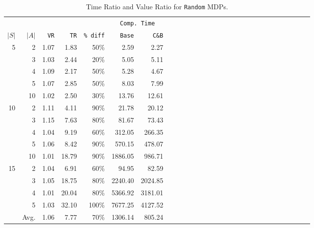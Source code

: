\begin{table}[h] %
 \setlength{\tabcolsep}{2.5pt}
 \renewcommand \arraystretch{1.1}
\begin{center}
\begin{tabular}{rrrrrrrrrrrrrrrrrrrrrrrrrrrr}
	&		&				&				&				&	\multicolumn{2}{c}{	\texttt{Comp. Time}}	\\
$|S|$	&	$|A|$	&		\texttt{VR}		&		\texttt{TR}		&		\texttt{\% diff}		&	\texttt{Base}	&	\texttt{C\&B}	\\
\cmidrule(lr){1-2} \cmidrule(lr){3-3} \cmidrule(lr){4-4}  \cmidrule(lr){5-5}  \cmidrule(lr){6-7}
5	&	2	&			1.07	&			1.83	&			50\%	&	2.59	&	2.27	\\
	&	3	&			1.03	&			2.44	&			20\%	&	5.05	&	5.11	\\
	&	4	&			1.09	&			2.17	&			50\%	&	5.28	&	4.67	\\
	&	5	&			1.07	&			2.85	&			50\%	&	8.03	&	7.99	\\
	&	10	&			1.02	&			2.50	&			30\%	&	13.76	&	12.61	\\
\cmidrule(lr){1-2} \cmidrule(lr){3-3} \cmidrule(lr){4-4}  \cmidrule(lr){5-5}  \cmidrule(lr){6-7}
10	&	2	&			1.11	&			4.11	&			90\%	&	21.78	&	20.12	\\
	&	3	&			1.15	&			7.63	&			80\%	&	81.67	&	73.43	\\
	&	4	&			1.04	&			9.19	&			60\%	&	312.05	&	266.35	\\
	&	5	&			1.06	&			8.42	&			90\%	&	570.15	&	478.07	\\
	&	10	&			1.01	&			18.79	&			90\%	&	1886.05	&	986.71	\\
\cmidrule(lr){1-2} \cmidrule(lr){3-3} \cmidrule(lr){4-4}  \cmidrule(lr){5-5}  \cmidrule(lr){6-7}
15	&	2	&			1.04	&			6.91	&			60\%	&	94.95	&	82.59	\\
	&	3	&			1.05	&			18.75	&			80\%	&	2240.40	&	2024.85	\\
	&	4	&			1.01	&			20.04	&			80\%	&	5366.92	&	3181.01	\\
	&	5	&			1.03	&			32.10	&			100\%	&	7677.25	&	4127.52	\\
\cmidrule(lr){1-2} \cmidrule(lr){3-3} \cmidrule(lr){4-4}  \cmidrule(lr){5-5}  \cmidrule(lr){6-7}
	&	Avg.	&			1.06	&			7.77	&			70\%	&	1306.14	&	805.24	
\end{tabular}						
\end{center}
\caption{Time Ratio and Value Ratio for \texttt{Random} MDPs.}														\label{tab:random}								
\end{table} %
